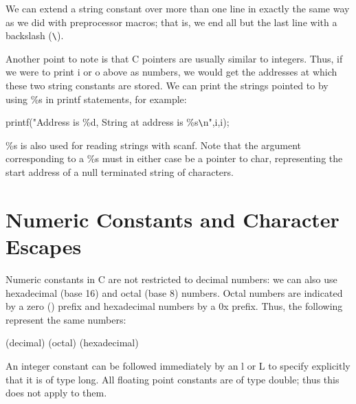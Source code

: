      We can  extend a  string constant  over more than one line in
exactly the same way  as we did with preprocessor macros; that is, we
end all but the last line with a backslash (\verb+\+).

     Another point to note is that C pointers are usually similar to
integers. Thus, if we  were to  print {\cd i}  or {\cd o}  above as
numbers, we would get the addresses at which these  two string
constants are stored. We can print the strings pointed to by using
{\cd \%s} in {\cd printf} statements, for example:
\begin{code}
printf("Address is \%d, String at address is \%s\verb+\+n",i,i);
\end{code}
\noindent
     {\cd \%s} is  also used for reading  strings with  {\cd scanf}.
Note  that  the argument corresponding  to a  {\cd \%s} must  in
either  case be  a pointer  to char, representing the start address
of a null terminated string of characters.



\section{Numeric Constants and Character Escapes}

     Numeric constants in C are not restricted to decimal numbers: we
can also use {\kc hexadecimal\/}  (base 16)  and {\kc octal\/} (base
8) numbers.  Octal  numbers  are indicated by  a zero ({}) 
prefix and hexadecimal numbers 
by a 
{\cd 0x} prefix. Thus, the
following represent the same numbers:
\begin{display}
{} (decimal)  (octal)  (hexadecimal)
\end{display}
\noindent
     An integer constant can be followed immediately by an {\cd l} or
{\cd L} to specify explicitly that  it is  of type  
{\cd long}. 
All floating point  constants are of type 
{\cd double}; thus this does
not apply to them.

